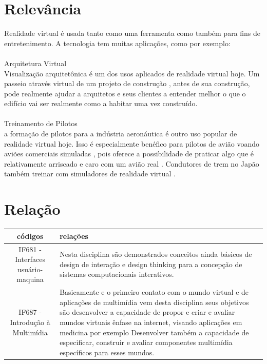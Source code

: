 \documentclass[10pt]{article}
\begin{document}
\section{Relevância}
Realidade virtual é usada tanto como uma ferramenta como também para fins de entretenimento. A tecnologia tem muitas aplicações, como por exemplo:\\\\
Arquitetura Virtual \\
Visualização arquitetônica é um dos usos aplicados de realidade virtual hoje. Um passeio através virtual de um projeto de construção , antes de sua construção, pode realmente ajudar a arquitetos e seus clientes a entender melhor o que o edifício vai ser realmente como a habitar uma vez construído.\cite{importancia} \\\\
Treinamento de Pilotos \\
a formação de pilotos para a indústria aeronáutica é outro uso popular de realidade virtual hoje. Isso é especialmente benéfico para pilotos de avião voando aviões comerciais simuladas , pois oferece a possibilidade de praticar algo que é relativamente arriscado e caro com um avião real . Condutores de trem no Japão também treinar com simuladores de realidade virtual . \cite{importancia}


\section{Relação}

\begin{center}
\begin{tabular}{|c|p{7cm}|}
\hline
códigos & relações \\ \hline
 IF681 - Interfaces usuário-maquina &
 Nesta disciplina são demonstrados conceitos ainda básicos de design de interação e design thinking para a concepção de sistemas computacionais interativos.\cite{IF681}
 \\ \hline
  IF687 - Introdução à Multimídia  & 
Basicamente e o primeiro contato com o mundo virtual e de aplicações de multimídia vem desta disciplina seus objetivos são desenvolver a capacidade de propor e criar e avaliar mundos virtuais ênfase na internet, visando aplicações em medicina por exemplo
Desenvolver também a capacidade de especificar, construir e avaliar componentes multimídia específicos para esses mundos. \cite{IF687}
\\ \hline

\end{tabular}    
\end{center}



\end{document}
